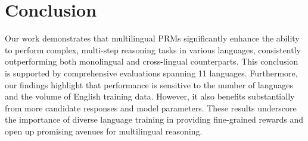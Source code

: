 \section{Conclusion}
\label{sec:conclusion}


Our work demonstrates that multilingual PRMs significantly enhance the ability to perform complex, multi-step reasoning tasks in various languages, consistently outperforming both monolingual and cross-lingual counterparts. This conclusion is supported by comprehensive evaluations spanning 11 languages. Furthermore, our findings highlight that performance is sensitive to the number of languages and the volume of English training data. However, it also benefits substantially from more candidate responses and model parameters. These results underscore the importance of diverse language training in providing fine-grained rewards and open up promising avenues for multilingual reasoning.
